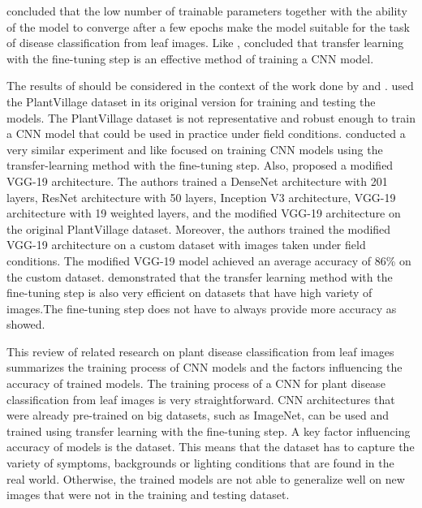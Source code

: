 \documentclass{BachelorBUI}
\begin{document}
        \cite{Too:2019} concluded that the low number of trainable parameters together with the ability of the model to converge after a few epochs make the model suitable for the task of disease classification from leaf images. Like \textcite{Mohanty:2016}, \textcite{Too:2019} concluded that transfer learning with the fine-tuning step is an effective method of training a CNN model.

        The results of \textcite{Too:2019} should be considered in the context of the work done by \textcite{Barbedo:2018:1} and \textcite{Barbedo:2018:2}. \textcite{Too:2019} used the PlantVillage dataset in its original version for training and testing the models. The PlantVillage dataset is not representative and robust enough to train a CNN model that could be used in practice under field conditions. \textcite{Chen:2020} conducted a very similar experiment and like \textcite{Too:2019} focused on training CNN models using the transfer-learning method with the fine-tuning step. Also, \textcite{Chen:2020} proposed a modified VGG-19 architecture. The authors trained a DenseNet architecture with 201 layers, ResNet architecture with 50 layers, Inception V3 architecture, VGG-19 architecture with 19 weighted layers, and the modified VGG-19 architecture on the original PlantVillage dataset. Moreover, the authors trained the modified VGG-19 architecture on a custom dataset with images taken under field conditions. The modified VGG-19 model achieved an average accuracy of 86\% on the custom dataset.  \textcite{Chen:2020} demonstrated that the transfer learning method with the fine-tuning step is also very efficient on datasets that have high variety of images.The fine-tuning step does not have to always provide more accuracy as \textcite{Sladojevic:2016} showed.

        This review of related research on plant disease classification from leaf images summarizes the training process of CNN models and the factors influencing the accuracy of trained models. The training process of a CNN for plant disease classification from leaf images is very straightforward. CNN architectures that were already pre-trained on big datasets, such as ImageNet, can be used and trained using transfer learning with the fine-tuning step. A key factor influencing accuracy of models is the dataset. This means that the dataset has to capture the variety of symptoms, backgrounds or lighting conditions that are found in the real world. Otherwise, the trained models are not able to generalize well on new images that were not in the training and testing dataset.
\end{document}
